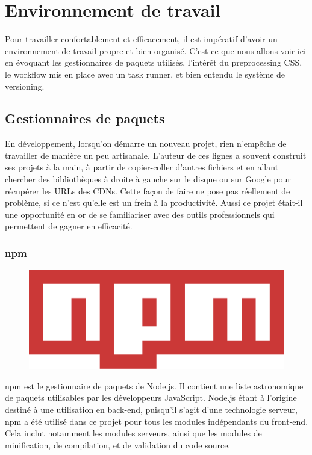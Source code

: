 \documentclass[a4paper,12pt]{article}
\begin{document}
\section{Environnement de travail}

Pour travailler confortablement et efficacement, il est impératif d'avoir un environnement de travail propre et bien organisé. C'est ce que nous allons voir ici en évoquant les gestionnaires de paquets utilisés, l'intérêt du preprocessing CSS, le workflow mis en place avec un task runner, et bien entendu le système de versioning.

\subsection{Gestionnaires de paquets}

En développement, lorsqu'on démarre un nouveau projet, rien n'empêche de travailler de manière un peu artisanale. L'auteur de ces lignes a souvent construit ses projets à la main, à partir de copier-coller d'autres fichiers et en allant chercher des bibliothèques à droite à gauche sur le disque ou sur Google pour récupérer les URLs des CDNs. Cette façon de faire ne pose pas réellement de problème, si ce n'est qu'elle est un frein à la productivité. Aussi ce projet était-il une opportunité en or de se familiariser avec des outils professionnels qui permettent de gagner en efficacité.

\subsubsection{npm}

\begin{figure}[!h]
  \begin{center}
    \includegraphics[scale=0.2]{logo-npm.png}
  \end{center}
\end{figure}

npm est le gestionnaire de paquets de Node.js. Il contient une liste astronomique de paquets utilisables par les développeurs JavaScript. Node.js étant à l'origine destiné à une utilisation en back-end, puisqu'il s'agit d'une technologie serveur, npm a été utilisé dans ce projet pour tous les modules indépendants du front-end. Cela inclut notamment les modules serveurs, ainsi que les modules de minification, de compilation, et de validation du code source.
\end{document}
